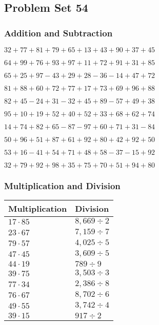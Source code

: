 \hypertarget{problem-set-54}{%
\subsection{Problem Set 54}\label{problem-set-54}}

\hypertarget{addition-and-subtraction}{%
\subsubsection{Addition and
Subtraction}\label{addition-and-subtraction}}

\(32+77+81+79+65+13+43+90+37+45\)

\(64+99+76+93+97+11+72+91+31+85\)

\(65+25+97-43+29+28-36-14+47+72\)

\(81+88+60+72+77+17+73+69+96+88\)

\(82+45-24+31-32+45+89-57+49+38\)

\(95+10+19+52+40+52+33+68+62+74\)

\(14+74+82+65-87-97+60+71+31-84\)

\(50+96+51+87+61+92+80+42+92+50\)

\(53+16-41+54+71+48+58-37-15+92\)

\(32+79+92+98+35+75+70+51+94+80\)

\hypertarget{multiplication-and-division}{%
\subsubsection{Multiplication and
Division}\label{multiplication-and-division}}

\begin{longtable}[]{@{}ll@{}}
\toprule
Multiplication & Division\tabularnewline
\midrule
\endhead
\(17\cdot85\) & \(8,669÷2\)\tabularnewline
\(23\cdot67\) & \(7,159÷7\)\tabularnewline
\(79\cdot57\) & \(4,025÷5\)\tabularnewline
\(47\cdot45\) & \(3,609÷5\)\tabularnewline
\(44\cdot19\) & \(789÷9\)\tabularnewline
\(39\cdot75\) & \(3,503÷3\)\tabularnewline
\(77\cdot34\) & \(2,386÷8\)\tabularnewline
\(76\cdot67\) & \(8,702÷6\)\tabularnewline
\(49\cdot55\) & \(3,742÷4\)\tabularnewline
\(39\cdot15\) & \(917÷2\)\tabularnewline
\bottomrule
\end{longtable}
